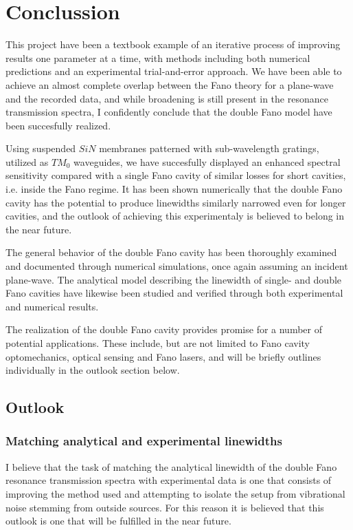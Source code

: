\section{Conclussion}

This project have been a textbook example of an iterative process of improving results one parameter at a time, with methods including both numerical predictions and an experimental trial-and-error approach. We have been able to achieve an almost complete overlap between the Fano theory for a plane-wave and the recorded data, and while broadening is still present in the resonance transmission spectra, I confidently conclude that the double Fano model have been succesfully realized. 

Using suspended $SiN$ membranes patterned with sub-wavelength gratings, utilized as $TM_0$ waveguides, we have succesfully displayed an enhanced spectral sensitivity compared with a single Fano cavity of similar losses for short cavities, i.e. inside the Fano regime. It has been shown numerically that the double Fano cavity has the potential to produce linewidths similarly narrowed even for longer cavities, and the outlook of achieving this experimentaly is believed to belong in the near future. 

The general behavior of the double Fano cavity has been thoroughly examined and documented through numerical simulations, once again assuming an incident plane-wave. The analytical model describing the linewidth of single- and double Fano cavities have likewise been studied and verified through both experimental and numerical results. 

The realization of the double Fano cavity provides promise for a number of potential applications. These include, but are not limited to Fano cavity optomechanics, optical sensing and Fano lasers, and will be briefly outlines individually in the outlook section  below. 

\subsection{Outlook}

\subsubsection{Matching analytical and experimental linewidths}

I believe that the task of matching the analytical linewidth of the double Fano resonance transmission spectra with experimental data is one that consists of improving the method used and attempting to isolate the setup from vibrational noise stemming from outside sources. For this reason it is believed that this outlook is one that will be fulfilled in the near future. 

